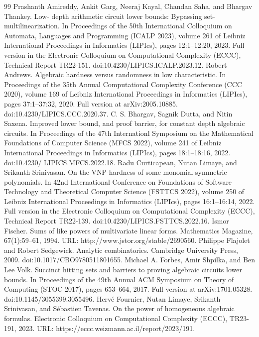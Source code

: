 \begin{thebibliography}{99}
 Prashanth Amireddy, Ankit Garg, Neeraj Kayal, Chandan Saha, and Bhargav Thankey. Low- depth arithmetic circuit lower bounds: Bypassing set-multilinearization. In Proceedings of the 50th International Colloquium on Automata, Languages and Programming (ICALP 2023), volume 261 of Leibniz International Proceedings in Informatics (LIPIcs), pages 12:1–12:20, 2023. Full version in the Electronic Colloquium on Computational Complexity (ECCC), Technical Report TR22-151. doi:10.4230/LIPICS.ICALP.2023.12.
 Robert Andrews. Algebraic hardness versus randomness in low characteristic. In Proceedings of the 35th Annual Computational Complexity Conference (CCC 2020), volume 169 of Leibniz International Proceedings in Informatics (LIPIcs), pages 37:1–37:32, 2020. Full version at arXiv:2005.10885. doi:10.4230/LIPICS.CCC.2020.37.
 C. S. Bhargav, Sagnik Dutta, and Nitin Saxena. Improved lower bound, and proof barrier, for constant depth algebraic circuits. In Proceedings of the 47th Internationl Symposium on the Mathematical Foundations of Computer Science (MFCS 2022), volume 241 of Leibniz International Proceedings in Informatics (LIPIcs), pages 18:1–18:16, 2022. doi:10.4230/ LIPICS.MFCS.2022.18.
 Radu Curticapean, Nutan Limaye, and Srikanth Srinivasan. On the VNP-hardness of some monomial symmetric polynomials. In 42nd International Conference on Foundations of Software Technology and Theoretical Computer Science (FSTTCS 2022), volume 250 of Leibniz International Proceedings in Informatics (LIPIcs), pages 16:1–16:14, 2022. Full version in the Electronic Colloquium on Computational Complexity (ECCC), Technical Report TR22-139. doi:10.4230/LIPICS.FSTTCS.2022.16.
 Ismor Fischer. Sums of like powers of multivariate linear forms. Mathematics Magazine, 67(1):59–61, 1994. URL: http://www.jstor.org/stable/2690560.
 Philippe Flajolet and Robert Sedgewick. Analytic combinatorics. Cambridge University Press, 2009. doi:10.1017/CBO9780511801655.
 Michael A. Forbes, Amir Shpilka, and Ben Lee Volk. Succinct hitting sets and barriers to proving algebraic circuits lower bounds. In Proceedings of the 49th Annual ACM Symposium on Theory of Computing (STOC 2017), pages 653–664, 2017. Full version at arXiv:1701.05328. doi:10.1145/3055399.3055496.
 Hervé Fournier, Nutan Limaye, Srikanth Srinivasan, and Sébastien Tavenas. On the power of homogeneous algebraic formulas. Electronic Colloquium on Computational Complexity (ECCC), TR23-191, 2023. URL: https://eccc.weizmann.ac.il/report/2023/191.

\end{thebibliography}
